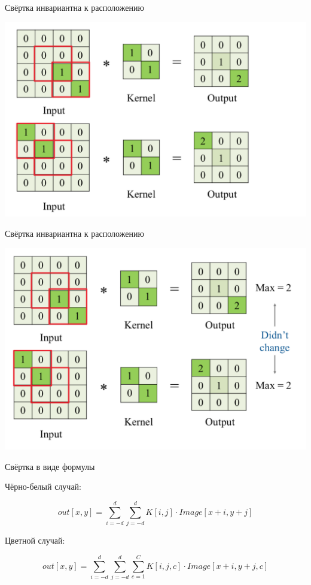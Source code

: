 \documentclass[notes,12pt, aspectratio=169]{beamer}
\begin{document}
\begin{frame}{Свёртка инвариантна к расположению}
\begin{center}
	\includegraphics[width=.8\linewidth]{conv_3.png}
\end{center}
\end{frame}


\begin{frame}{Свёртка инвариантна к расположению}
\begin{center}
	\includegraphics[width=.8\linewidth]{conv_4.png}
\end{center}
\end{frame}


\begin{frame}{Свёртка в виде формулы}

Чёрно-белый случай:

\[
out[x, y] = \sum_{i = -d}^{d}  \sum_{j= -d}^{d}   K[i, j] \cdot Image[x + i, y + j]
\]

Цветной случай: 

\[
out[x, y] = \sum_{i = -d}^{d}  \sum_{j= -d}^{d}  \sum_{c= 1}^{C}  K[i, j, c] \cdot Image[x + i, y + j, c]
\]

\end{frame}
\end{document}
